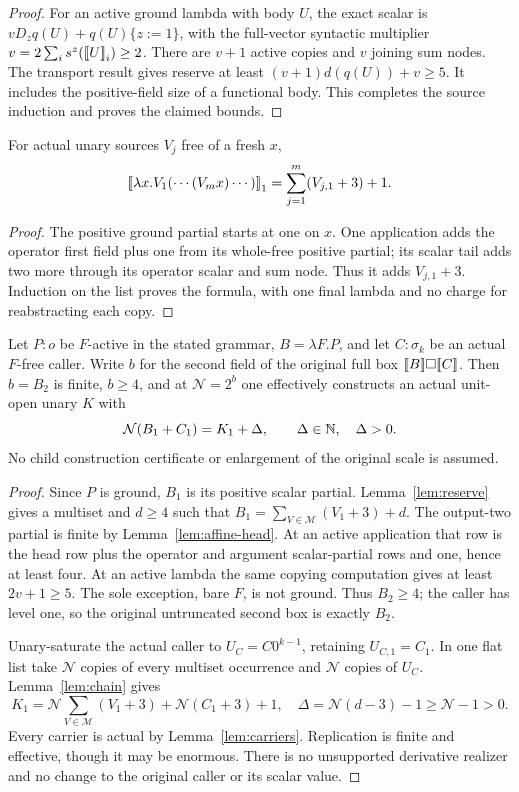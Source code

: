 \begin{proof}
For an active ground lambda with body $U$, the exact scalar is
$vD_zq(U)+q(U)\{z:=1\}$, with the full-vector syntactic multiplier
$v=2\sum_is^z(\mathopen{[\![}U\mathclose{]\!]}_i)\ge2$.  There are $v+1$ active copies and
$v$ joining sum nodes.  The transport result gives reserve at least
$(v+1)d(q(U))+v\ge5$.  It includes the positive-field size of a functional
body.  This completes the source induction and proves the claimed bounds.
\end{proof}

\begin{lemma}\label{lem:chain}
For actual unary sources $V_j$ free of a fresh $x$,
\[
 \mathopen{[\![}\lambda x.V_1(\cdots(V_mx)\cdots)\mathclose{]\!]}_1
       =\sum_{j=1}^m(V_{j,1}+3)+1.
\]
\end{lemma}
\begin{proof}
The positive ground partial starts at one on $x$.  One application adds
the operator first field plus one from its whole-free positive partial;
its scalar tail adds two more through its operator scalar and sum node.
Thus it adds $V_{j,1}+3$.  Induction on the list proves the formula, with
one final lambda and no charge for reabstracting each copy.
\end{proof}

\begin{theorem}\label{thm:ground-construction}
Let $P:o$ be $F$-active in the stated grammar, $B=\lambda F.P$, and
let $C:\sigma_k$ be an actual $F$-free caller.  Write $b$ for the second
field of the original full box $\mathopen{[\![}B\mathclose{]\!]}\square\mathopen{[\![}C\mathclose{]\!]}$.
Then $b=B_2$ is finite, $b\ge4$, and at $\mathcal N=2^b$ one effectively
constructs an actual unit-open unary $K$ with
\[
 \mathcal N(B_1+C_1)=K_1+\Delta,\qquad \Delta\in\mathbb N,\quad\Delta>0.
\]
No child construction certificate or enlargement of the original scale is
assumed.
\end{theorem}
\begin{proof}
Since $P$ is ground, $B_1$ is its positive scalar partial.  Lemma~\ref{lem:reserve}
gives a multiset and $d\ge4$ such that
$B_1=\sum_{V\in\mathcal M}(V_1+3)+d$.
The output-two partial is finite by Lemma~\ref{lem:affine-head}.  At an
active application that row is the head row plus the operator and argument
scalar-partial rows and one, hence at least four.  At an active lambda the
same copying computation gives at least $2v+1\ge5$.  The sole exception,
bare $F$, is not ground.  Thus $B_2\ge4$; the caller has level one, so
the original untruncated second box is exactly $B_2$.

Unary-saturate the actual caller to $U_C=C0^{k-1}$, retaining $U_{C,1}=C_1$.
In one flat list take $\mathcal N$ copies of every multiset occurrence and
$\mathcal N$ copies of $U_C$.  Lemma~\ref{lem:chain} gives
\[
 K_1=\mathcal N\sum_{V\in\mathcal M}(V_1+3)
             +\mathcal N(C_1+3)+1,
 \quad\Delta=\mathcal N(d-3)-1\ge\mathcal N-1>0.
\]
Every carrier is actual by Lemma~\ref{lem:carriers}.  Replication is finite
and effective, though it may be enormous.  There is no unsupported derivative
realizer and no change to the original caller or its scalar value.
\end{proof}

